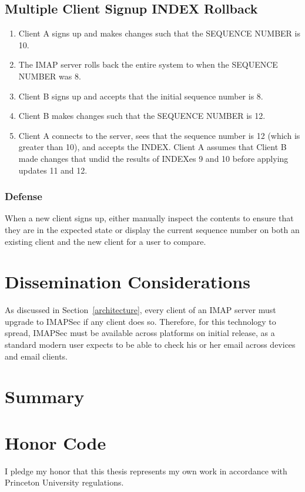 \documentclass[pageno]{jpaper}
\newcommand{\project}{IMAPSec }
\begin{document}
\subsection{Multiple Client Signup INDEX Rollback}
\begin{enumerate}
\item Client A signs up and makes changes such that the SEQUENCE NUMBER is 10.
\item The IMAP server rolls back the entire system to when the SEQUENCE NUMBER was 8.
\item Client B signs up and accepts that the initial sequence number is 8.
\item Client B makes changes such that the SEQUENCE NUMBER is 12.
\item Client A connects to the server, sees that the sequence number is 12 (which is greater than 10), and accepts the INDEX. Client A assumes that Client B made changes that undid the results of INDEXes 9 and 10 before applying updates 11 and 12.
\end{enumerate}

\subsubsection{Defense}
When a new client signs up, either manually inspect the contents to ensure that they are in the expected state or display the current sequence number on both an existing client and the new client for a user to compare.

\section{Dissemination Considerations}
As discussed in Section~\ref{architecture}, every client of an IMAP server must upgrade to \project if any client does so. Therefore, for this technology to spread, \project must be available across platforms on initial release, as a standard modern user expects to be able to check his or her email across devices and email clients. 

\section{Summary}

\section{Honor Code}
\label{honorcode}
I pledge my honor that this thesis represents my own work in accordance with Princeton University regulations.

\pagebreak



\end{document}
